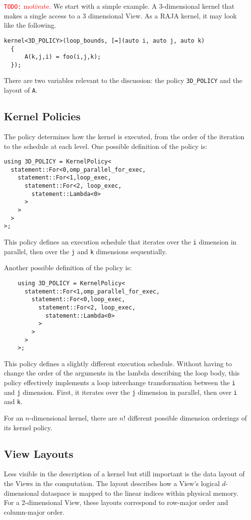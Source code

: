 \documentclass{article}
\newcommand{\todo}[1]{{\textcolor{red}{{\tt{TODO:}}\,\,#1 }}}
\begin{document}
\todo{motivate.}
We start with a simple example. A 3-dimensional kernel that makes a single access to a 3 dimensional View. As a RAJA kernel, it may look like the following.
\begin{lstlisting}
kernel<3D_POLICY>(loop_bounds, [=](auto i, auto j, auto k) 
  {
      A(k,j,i) = foo(i,j,k);
  });
\end{lstlisting}

There are two variables relevant to the discussion: the policy \verb.3D_POLICY. and the layout of \verb.A..

\subsection{Kernel Policies}
The policy determines how the kernel is executed, from the order of the iteration to the schedule at each level. One possible definition of the policy is:
\begin{lstlisting}
using 3D_POLICY = KernelPolicy<
  statement::For<0,omp_parallel_for_exec,
    statement::For<1,loop_exec,
      statement::For<2, loop_exec,
        statement::Lambda<0>
      >
    >
  >
>;
\end{lstlisting}
This policy defines an execution schedule that iterates over the \verb.i. dimension in parallel, then over the \verb.j. and \verb.k. dimensions sequentially. 

Another possible definition of the policy is:
\begin{lstlisting}
    using 3D_POLICY = KernelPolicy<
      statement::For<1,omp_parallel_for_exec,
        statement::For<0,loop_exec,
          statement::For<2, loop_exec,
            statement::Lambda<0>
          >
        >
      >
    >;
\end{lstlisting}
This policy defines a slightly different execution schedule. 
Without having to change the order of the arguments in the lambda describing the loop body, this policy effectively implements a loop interchange transformation between the \verb.i. and \verb.j. dimension. 
First, it iterates over the \verb.j. dimension in parallel, then over \verb.i. and \verb.k..

For an $n$-dimensional kernel, there are $n!$ different possible dimension orderings of its kernel policy. 


\subsection{View Layouts}

Less visible in the description of a kernel but still important is the data layout of the Views in the computation. 
The layout describes how a View's logical $d$-dimensional dataspace is mapped to the linear indices within physical memory. 
For a 2-dimensional View, these layouts correspond to row-major order and column-major order. 
\end{document}
